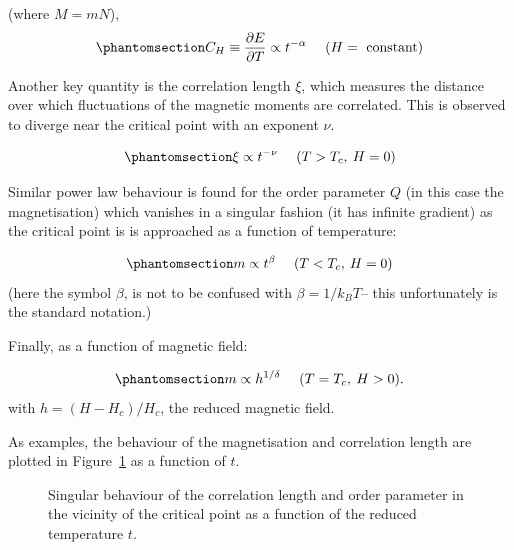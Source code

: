 \documentclass[
  letterpaper,
  DIV=11,
  numbers=noendperiod]{scrreprt}
\begin{document}
(where \(M=mN\)), \begin{equation}\phantomsection\label{eq-Cv}{
C_H \equiv \frac{\partial E}{\partial T}\propto t^{-\alpha} ~~~~ (H=\textrm{ constant}) 
}\end{equation}

Another key quantity is the correlation length \(\xi\), which measures
the distance over which fluctuations of the magnetic moments are
correlated. This is observed to diverge near the critical point with an
exponent \(\nu\).

\begin{equation}\phantomsection\label{eq-corr}{
\xi \propto t^{-\nu} ~~~~ (T > T_c,\: H=0)
}\end{equation}

Similar power law behaviour is found for the order parameter \(Q\) (in
this case the magnetisation) which vanishes in a singular fashion (it
has infinite gradient) as the critical point is is approached as a
function of temperature:

\begin{equation}\phantomsection\label{eq-mag}{
m \propto t^{\beta} ~~~~ (T < T_c,\: H=0) 
}\end{equation} (here the symbol \(\beta\), is not to be confused with
\(\beta=1/k_BT\)-- this unfortunately is the standard notation.)

Finally, as a function of magnetic field:

\begin{equation}\phantomsection\label{eq-field}{m \propto h^{1/\delta} ~~~~ (T = T_c,\: H>0) .}\end{equation}
with \(h=(H-H_c)/H_c\), the reduced magnetic field.

As examples, the behaviour of the magnetisation and correlation length
are plotted in Figure~\ref{fig-sing} as a function of \(t\).

\begin{figure}


\caption{\label{fig-sing}Singular behaviour of the correlation length
and order parameter in the vicinity of the critical point as a function
of the reduced temperature \(t\).}

\end{figure}%
\end{document}

